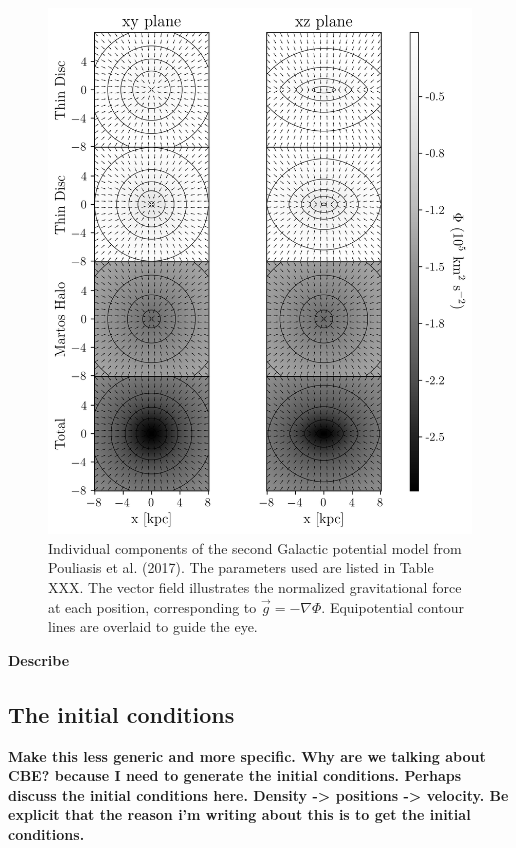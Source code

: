         \begin{figure}
            \centering
            \includegraphics[width=\linewidth]{images/figure_pouliasis2017pii_potential_-8_8.png}
            \caption{Individual components of the second Galactic potential model from Pouliasis et al. (2017). The parameters used are listed in Table XXX. The vector field illustrates the normalized gravitational force at each position, corresponding to $\vec{g} = -\nabla\Phi$. Equipotential contour lines are overlaid to guide the eye.}
            \label{fig:figure_pouliasis2017pii_potential}
        \end{figure}        

        \textbf{Describe }
    
    \subsection{The initial conditions}\label{subsec:initialconditions}

        \textbf{Make this less generic and more specific. Why are we talking about CBE? because I need to generate the initial conditions. Perhaps discuss the initial conditions here.  Density -> positions -> velocity. Be explicit that the reason i'm writing about this is to get the initial conditions.}

